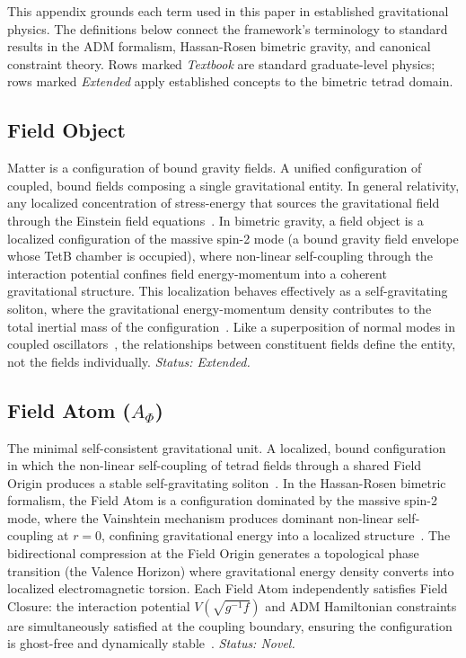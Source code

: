\documentclass[aps,prd,preprint,superscriptaddress,showpacs,preprintnumbers,amsmath,amssymb,nofootinbib]{revtex4-2}
\begin{document}
This appendix grounds each term used in this paper in established gravitational physics. The definitions below connect the framework's terminology to standard results in the ADM formalism, Hassan-Rosen bimetric gravity, and canonical constraint theory. Rows marked \emph{Textbook} are standard graduate-level physics; rows marked \emph{Extended} apply established concepts to the bimetric tetrad domain.

\subsection*{Field Object}

Matter is a configuration of bound gravity fields. A unified configuration of coupled, bound fields composing a single gravitational entity. In general relativity, any localized concentration of stress-energy that sources the gravitational field through the Einstein field equations~\cite{mtw1973}. In bimetric gravity, a field object is a localized configuration of the massive spin-2 mode (a bound gravity field envelope whose TetB chamber is occupied), where non-linear self-coupling through the interaction potential confines field energy-momentum into a coherent gravitational structure. This localization behaves effectively as a self-gravitating soliton, where the gravitational energy-momentum density contributes to the total inertial mass of the configuration~\cite{hassan2012,wheeler1955}. Like a superposition of normal modes in coupled oscillators~\cite{goldstein2002,feynman1985}, the relationships between constituent fields define the entity, not the fields individually. \emph{Status: Extended.}

\subsection*{Field Atom ($A_\Phi$)}

The minimal self-consistent gravitational unit. A localized, bound configuration in which the non-linear self-coupling of tetrad fields through a shared Field Origin produces a stable self-gravitating soliton~\cite{wheeler1955}. In the Hassan-Rosen bimetric formalism, the Field Atom is a configuration dominated by the massive spin-2 mode, where the Vainshtein mechanism produces dominant non-linear self-coupling at $r = 0$, confining gravitational energy into a localized structure~\cite{hassan2012,vainshtein1972}. The bidirectional compression at the Field Origin generates a topological phase transition (the Valence Horizon) where gravitational energy density converts into localized electromagnetic torsion. Each Field Atom independently satisfies Field Closure: the interaction potential $V(\sqrt{g^{-1}f})$ and ADM Hamiltonian constraints are simultaneously satisfied at the coupling boundary, ensuring the configuration is ghost-free and dynamically stable~\cite{adm1962}. \emph{Status: Novel.}
\end{document}
